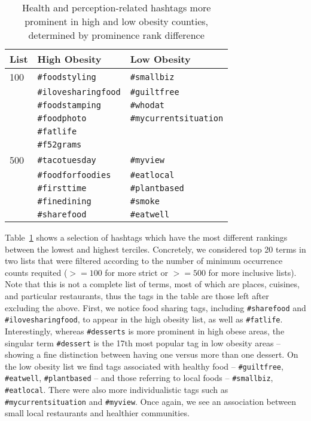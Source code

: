 \documentclass{sig-alternate-2013}
\begin{document}
\begin{table}[t]
\caption{Health and perception-related hashtags more prominent in high and low obesity counties, determined by prominence rank difference}
\begin{center}
\footnotesize
\begin{tabular}{lll}
\toprule
\textbf{List} & \textbf{High Obesity} & \textbf{Low Obesity} \\
\midrule
100 & \texttt{\#foodstyling} & \texttt{\#smallbiz} \\ 
    & \texttt{\#ilovesharingfood} & \texttt{\#guiltfree} \\ 
    & \texttt{\#foodstamping} & \texttt{\#whodat} \\ 
    & \texttt{\#foodphoto} & \texttt{\#mycurrentsituation} \\ 
    & \texttt{\#fatlife} &  \\ 
    & \texttt{\#f52grams} &  \\ 
\midrule
500 & \texttt{\#tacotuesday} & \texttt{\#myview} \\ 
    & \texttt{\#foodforfoodies} & \texttt{\#eatlocal} \\ 
    & \texttt{\#firsttime} & \texttt{\#plantbased} \\ 
    & \texttt{\#finedining} & \texttt{\#smoke} \\ 
    & \texttt{\#sharefood} & \texttt{\#eatwell} \\
\bottomrule
\end{tabular}
\label{tbl:tags_highlowobesity}
\end{center}
\end{table}

Table~\ref{tbl:tags_highlowobesity} shows a selection of hashtags which have the most different rankings between the lowest and highest terciles. Concretely, we considered top 20 terms in two lists that were filtered according to the number of minimum occurrence counts requited ($>=100$ for more strict or $>=500$ for more inclusive lists). Note that this is not a complete list of terms, most of which are places, cuisines, and particular restaurants, thus the tags in the table are those left after excluding the above. First, we notice food sharing tags, including \texttt{\#sharefood} and \texttt{\#ilovesharingfood}, to appear in the high obesity list, as well as \texttt{\#fatlife}. Interestingly, whereas \texttt{\#desserts} is more prominent in high obese areas, the singular term \texttt{\#dessert} is the 17th most popular tag in low obesity areas -- showing a fine distinction between having one versus more than one dessert. On the low obesity list we find tags associated with healthy food -- \texttt{\#guiltfree}, \texttt{\#eatwell}, \texttt{\#plantbased} -- and those referring to local foods -- \texttt{\#smallbiz}, \texttt{\#eatlocal}. There were also more individualistic tags such as \texttt{\#mycurrentsituation} and \texttt{\#myview}. Once again, we see an association between small local restaurants and healthier communities. 
\end{document}
